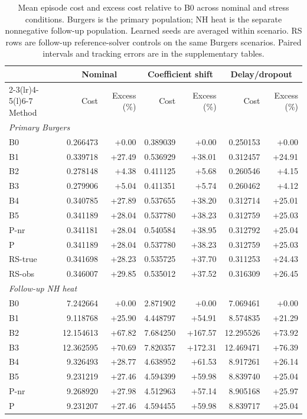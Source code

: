\begin{table}[t]
\caption{Mean episode cost and excess cost relative to B0 across nominal and stress conditions. Burgers is the primary population; NH heat is the separate nonnegative follow-up population. Learned seeds are averaged within scenario. RS rows are follow-up reference-solver controls on the same Burgers scenarios. Paired intervals and tracking errors are in the supplementary tables.}\label{tab:nominal}
\centering\small
\begin{tabular}{@{}lrrrrrr@{}}\toprule
& \multicolumn{2}{c}{Nominal} & \multicolumn{2}{c}{Coefficient shift} & \multicolumn{2}{c}{Delay/dropout}\\
\cmidrule(lr){2-3}\cmidrule(lr){4-5}\cmidrule(l){6-7}
Method & Cost & Excess (\%) & Cost & Excess (\%) & Cost & Excess (\%)\\\midrule
\multicolumn{7}{l}{\textit{Primary Burgers}}\\
B0 & 0.266473 & +0.00 & 0.389039 & +0.00 & 0.250153 & +0.00\\
B1 & 0.339718 & +27.49 & 0.536929 & +38.01 & 0.312457 & +24.91\\
B2 & 0.278148 & +4.38 & 0.411125 & +5.68 & 0.260546 & +4.15\\
B3 & 0.279906 & +5.04 & 0.411351 & +5.74 & 0.260462 & +4.12\\
B4 & 0.340785 & +27.89 & 0.537655 & +38.20 & 0.312714 & +25.01\\
B5 & 0.341189 & +28.04 & 0.537780 & +38.23 & 0.312759 & +25.03\\
P-nr & 0.341181 & +28.04 & 0.540584 & +38.95 & 0.312792 & +25.04\\
P & 0.341189 & +28.04 & 0.537780 & +38.23 & 0.312759 & +25.03\\
RS-true & 0.341698 & +28.23 & 0.535725 & +37.70 & 0.311253 & +24.43\\
RS-obs & 0.346007 & +29.85 & 0.535012 & +37.52 & 0.316309 & +26.45\\
\midrule
\multicolumn{7}{l}{\textit{Follow-up NH heat}}\\
B0 & 7.242664 & +0.00 & 2.871902 & +0.00 & 7.069461 & +0.00\\
B1 & 9.118768 & +25.90 & 4.448797 & +54.91 & 8.574835 & +21.29\\
B2 & 12.154613 & +67.82 & 7.684250 & +167.57 & 12.295526 & +73.92\\
B3 & 12.362595 & +70.69 & 7.820357 & +172.31 & 12.469471 & +76.39\\
B4 & 9.326493 & +28.77 & 4.638952 & +61.53 & 8.917261 & +26.14\\
B5 & 9.231219 & +27.46 & 4.594399 & +59.98 & 8.839740 & +25.04\\
P-nr & 9.268920 & +27.98 & 4.512963 & +57.14 & 8.905168 & +25.97\\
P & 9.231207 & +27.46 & 4.594455 & +59.98 & 8.839717 & +25.04\\
\bottomrule
\end{tabular}
\end{table}
